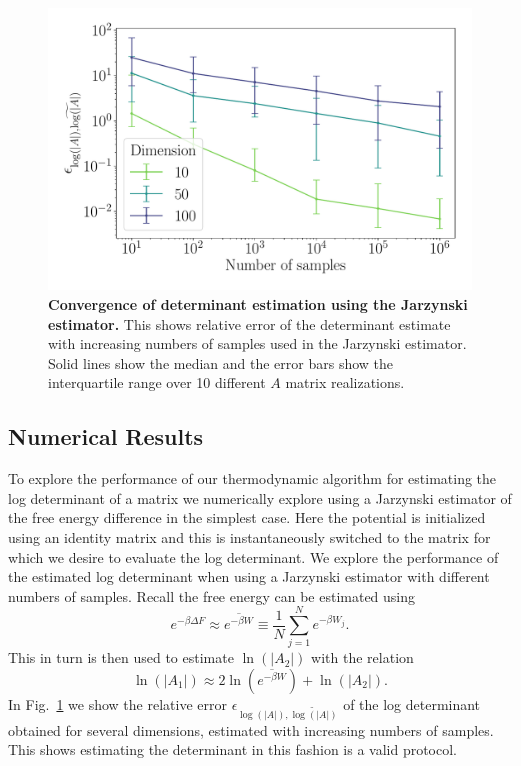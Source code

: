 \documentclass[prx,onecolumn,floatfix,longbibliography,notitlepage, nofootinbib,12pt]{revtex4-2}
\begin{document}
\begin{appendix}
\begin{figure}
    \centering
    \includegraphics[width=0.5\linewidth]{figures/rel_det_error_w_samples_F.pdf}
    \caption{\textbf{Convergence of determinant estimation using the Jarzynski estimator.} This shows relative error of the determinant estimate with increasing numbers of samples used in the Jarzynski estimator. Solid lines show the median and the error bars show the interquartile range over 10 different $A$ matrix realizations.}
    \label{fig:det}
\end{figure}


\subsection{Numerical Results}\label{app:det_numerics}

To explore the performance of our thermodynamic algorithm for estimating the log determinant of a matrix we numerically explore using a Jarzynski estimator of the free energy difference in the simplest case. Here the potential is initialized using an identity matrix and this is instantaneously switched to the matrix for which we desire to evaluate the log determinant. We explore the performance of the estimated log determinant when using a Jarzynski estimator with different numbers of samples. Recall the free energy can be estimated using
\begin{equation}
    e^{-\beta \Delta F}\approx \overline{e^{-\beta W}}  \equiv \frac{1}{N}\sum_{j=1}^N e^{-\beta W_j}.
\end{equation}
 This in turn is then used to estimate $\ln\left( \left| A_2\right|\right)$ with the relation
\begin{equation}
\ln\left(\left| A_1\right|\right) \approx 2 \ln\left(\overline{e^{-\beta W}}\right)  + \ln\left( \left| A_2\right|\right).
\end{equation}
In Fig.~\ref{fig:det} we show the relative error $\epsilon_{\log(|A|), \widetilde{\log(|A|)}}$ of the log determinant obtained for several dimensions, estimated with increasing numbers of samples. This shows estimating the determinant in this fashion is a valid protocol. 











\end{appendix}
\end{document}
